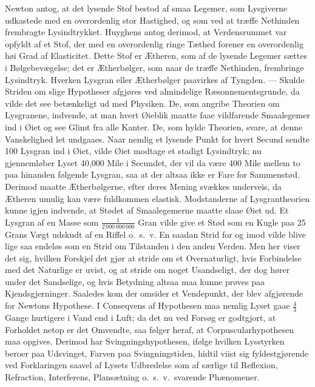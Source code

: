 \documentclass[12pt]{book}
\newcommand{\apage}[1]{\marginnote{\footnotesize\textit{[#1]}}}
\begin{document}
Newton antog, at det lysende Stof bestod af smaa Legemer, som Lysgiverne
udkastede med en overordenlig stor Hastighed, og som ved at træffe
Nethinden frembragte Lysindtrykket. Huyghens antog derimod, at
Verdensrummet var opfyldt af et Stof, der med en overordenlig ringe Tæthed
forener en overordenlig høi Grad af Elasticitet. Dette Stof er Ætheren, som
af de lysende Legemer sættes i Bølgebevægelse; det er Ætherbølger, som naar
de træffe Nethinden, frembringe Lysindtryk. Hverken Lysgran eller
Ætherbølger paavirkes af Tyngden. --- Skulde Striden om slige Hypotheser
afgjøres ved almindelige Ræsonnementsgrunde, da vilde det see betænkeligt
ud med Physiken. De, som angribe Theorien om Lysgranene, indvende, at man
hvert Øieblik maatte faae vildfarende Smaalegemer ind i Øiet og see Glimt
fra alle Kanter. De, som hylde Theorien, svare, at denne Vanskelighed let
undgaaes. Naar nemlig et lysende Punkt for hvert Secund sendte 100 Lysgran
ind i Øiet, vilde Øiet modtage et stadigt Lysindtryk; nu gjennemløber Lyset
40,000 Mile i Secundet, der vil da være 400 Mile mellem to paa hinanden
følgende Lysgran, \apage{140} saa at der altsaa ikke er Fare for Sammenstød. Derimod
maatte Ætherbølgerne, efter deres Mening svækkes underveis, da Ætheren
umulig kan være fuldkommen elastisk. Modstanderne af Lysgrantheorien kunne
igjen indvende, at Stødet af Smaalegemerne maatte slaae Øiet ud. Et Lysgran
af en Masse som $\frac{1}{2\,000\,000\,000}$ Gran vilde give et Stød som en
Kugle paa 25 Grans Vægt udskudt af en Riffel o.\ s.\ v. En saadan Strid for og
imod vilde blive lige saa endeløs som en Strid om Tilstanden i den anden
Verden. Men her viser det sig, hvilken Forskjel det gjør at stride om et
Overnaturligt, hvis Forbindelse med det Naturlige er uvist, og at stride om
noget Usandseligt, der dog hører under det Sandselige, og hvis Betydning
altsaa maa kunne prøves paa Kjendsgjerninger. Saaledes kom der omsider et
Vendepunkt, der blev afgjørende for Newtons Hypothese. I Conseqvens af
Hypothesen maa nemlig Lyset gaae $\tfrac43$ Gange hurtigere i Vand end i
Luft; da det nu ved Forsøg er godtgjort, at Forholdet netop er det
Omvendte, saa følger heraf, at Corpuscularhypothesen maa opgives. Derimod
har Svingningshypothesen, ifølge hvilken Lysstyrken beroer paa Udsvinget,
Farven paa Svingningstiden, hidtil viist sig fyldestgjørende ved
Forklaringen saavel af Lysets Udbredelse som af særlige til Reflexion,
Refraction, Interferens, Plansætning o.\ s.\ v.\ svarende Phænomener.
\end{document}
